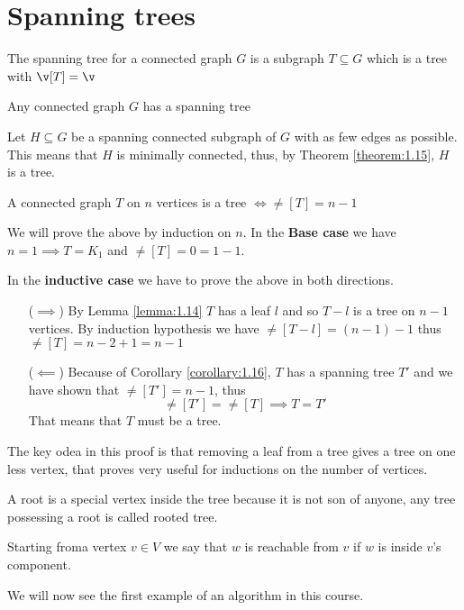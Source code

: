 \section{Spanning trees}
\begin{definition}
    The spanning tree for a connected graph $G$ is a subgraph $T \subseteq G$ which is a tree with $\v[T] = \v$
\end{definition}
\begin{customcorollary}{1.16}
    \label{corollary:1.16}
    Any connected graph $G$ has a spanning tree
\end{customcorollary}
\begin{prf}
    Let $H \subseteq G$ be a spanning connected subgraph of $G$ with as few edges as possible. This means that $H$ is minimally connected, thus, by Theorem \ref{theorem:1.15}, $H$ is a tree.
\end{prf}
\begin{customtheorem}{1.17}
    \label{theorem:1.17}
    A connected graph $T$ on $n$ vertices is a tree $\iff \ne[T] = n - 1$
\end{customtheorem}
\begin{prf}
    We will prove the above by induction on $n$. In the \textbf{Base case} we have $n = 1 \implies T = K_1$ and $\ne[T] = 0 = 1 - 1$.

    In the \textbf{inductive case} we have to prove the above in both directions.
    \begin{itemize}
        \item [($\implies$)] By Lemma \ref{lemma:1.14} $T$ has a leaf $l$ and so $T - l$ is a tree on $n - 1$ vertices. By induction hypothesis we have $\ne[T - l] = (n - 1) - 1$ thus $\ne[T] = n - 2 + 1 = n - 1$
        \item [($\impliedby$)] Because of Corollary \ref{corollary:1.16}, $T$ has a spanning tree $T'$ and we have shown that $\ne[T'] = n - 1$, thus
        \begin{equation*}
            \ne[T'] = \ne[T] \implies T = T'
        \end{equation*}
        That means that $T$ must be a tree.
    \end{itemize}
\end{prf}
\begin{coolfact}
    The key odea in this proof is that removing a leaf from a tree gives a tree on one less vertex, that proves very useful for inductions on the number of vertices.
\end{coolfact}
\begin{definition}[Root]
    A root is a special vertex inside the tree because it is not son of anyone, any tree possessing a root is called rooted tree.
\end{definition}
\begin{definition}[Reachability]
    Starting froma  vertex $v \in V$ we say that $w$ is reachable from $v$ if $w$ is inside $v$'s component.
\end{definition}
We will now see the first example of an algorithm in this course.
